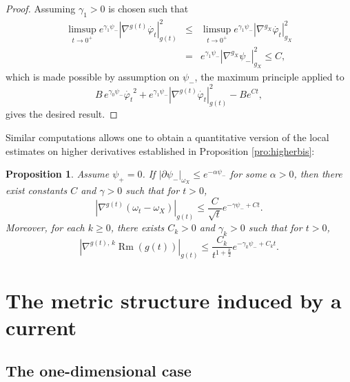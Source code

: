 \documentclass[a4paper,11pt,leqno,english]{smfart}
\theoremstyle{plain}
\theoremstyle{plain}
\numberwithin{equation}{section} %
\numberwithin{figure}{section} %
\theoremstyle{plain}
\newtheorem{prop}[thm]{Proposition} %
\theoremstyle{plain}
\theoremstyle{remark}
\theoremstyle{remark}
\theoremstyle{definition}
\theoremstyle{plain}
\theoremstyle{plain}
\theoremstyle{definition}
\newcommand{\f}{\varphi}
\newcommand{\Rm}{\operatorname{Rm}}
\begin{document}
\begin{proof}
 Assuming $\gamma_1>0$ is chosen such that  
\begin{eqnarray*}
 \limsup_{t\rightarrow 0^+}e^{\gamma_1\psi_{-}}|\nabla^{g(t)}\dot{\f_t}|_{g(t)}^2
 &\leq & \limsup_{t\rightarrow 0^+}e^{\gamma_1\psi_{-}}|\nabla^{g_X}\dot{\f_t}|_{g_X}^2 \\
 &=& e^{\gamma_1\psi_{-}}|\nabla^{g_X}\psi_{-}|_{g_X}^2\leq C,
 \end{eqnarray*}
 which is made possible by assumption on $\psi_{-}$, the maximum principle applied to $$B\,e^{\gamma_0\psi_{-}}\dot{\f_t}^2+e^{\gamma_1\psi_{-}}|\nabla^{g(t)}\dot{\f_t}|_{g(t)}^2-Be^{Ct},$$ gives the desired result.
\end{proof}
Similar computations allows one to obtain a quantitative version of 
the local estimates on higher derivatives established in Proposition \ref{pro:higherbis}:
\begin{prop}\label{pro:alix2}
Assume $\psi_+=0$. If $|\partial\psi_{-}|_{\omega_X}\leq e^{-\alpha\psi_{-}}$ for some $\alpha> 0$,  then there exist constants $C$ and $\gamma>0$ such that for $t>0$,
\begin{equation*}
|\nabla^{g(t)}(\omega_t-\omega_X)|_{g(t)}\leq\frac{C}{\sqrt{t}}e^{-\gamma\psi_{-}+Ct}.
\end{equation*}
Moreover, for each $k\geq 0$, there exists $C_k>0$ and $\gamma_k>0$ such that for $t>0$,
\begin{equation*}
|\nabla^{g(t),\,k}\Rm(g(t))|_{g(t)}\leq\frac{C_k}{t^{1+\frac{k}{2}}}e^{-\gamma_k\psi_{-}+C_kt}.
\end{equation*}

\end{prop}
 

 
 


 
 
 
 
 
 \section{The metric structure induced by a current} \label{sec:metricspace}
 


 
 
 \subsection{The one-dimensional case} \label{sec:dim1}
 
\end{document}
